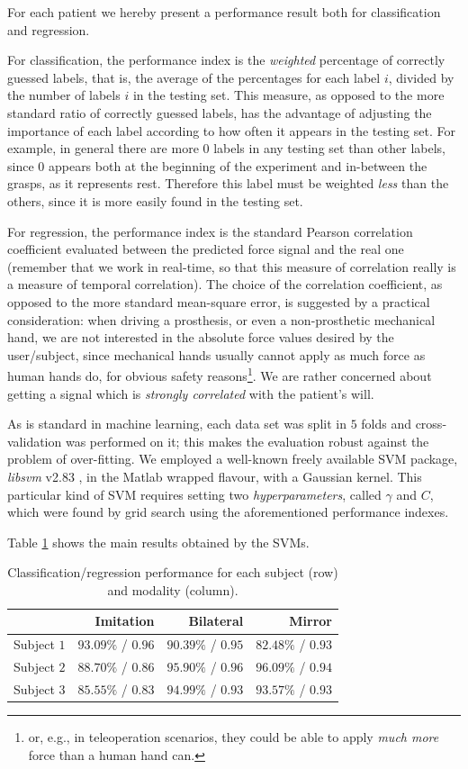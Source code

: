 For each patient we hereby present a performance result both for
classification and regression.

For classification, the performance index is the \emph{weighted}
percentage of correctly guessed labels, that is, the average of the
percentages for each label $i$, divided by the number of labels $i$ in
the testing set. This measure, as opposed to the more standard ratio
of correctly guessed labels, has the advantage of adjusting the
importance of each label according to how often it appears in the
testing set. For example, in general there are more $0$ labels in any
testing set than other labels, since $0$ appears both at the beginning
of the experiment and in-between the grasps, as it represents
rest. Therefore this label must be weighted \emph{less} than the
others, since it is more easily found in the testing set.

For regression, the performance index is the standard Pearson
correlation coefficient evaluated between the predicted force signal
and the real one (remember that we work in real-time, so that this
measure of correlation really is a measure of temporal
correlation). The choice of the correlation coefficient, as opposed to
the more standard mean-square error, is suggested by a practical
consideration: when driving a prosthesis, or even a non-prosthetic
mechanical hand, we are not interested in the absolute force values
desired by the user/subject, since mechanical hands usually cannot
apply as much force as human hands do, for obvious safety
reasons\footnote{or, e.g., in teleoperation scenarios, they could be
able to apply \emph{much more} force than a human hand can.}. We are
rather concerned about getting a signal which is \emph{strongly
correlated} with the patient's will.

As is standard in machine learning, each data set was split in $5$
folds and cross-validation was performed on it; this makes the
evaluation robust against the problem of over-fitting. We employed a
well-known freely available SVM package, \emph{libsvm} v2.83
\cite{ChangL01}, in the Matlab wrapped flavour, with a Gaussian
kernel. This particular kind of SVM requires setting two
\emph{hyperparameters}, called $\gamma$ and $C$, which were found by
grid search using the aforementioned performance indexes.

Table \ref{tab:results} shows the main results obtained by the SVMs.

\begin{table}[!ht] \centering
  \caption{Classification/regression performance for each subject
    (row) and modality (column).}
  \begin{tabular}{|c|r|r|r|}
    \hline
                & Imitation & Bilateral & Mirror \\
    \hline
    Subject $1$ & $93.09\%$ / $0.96$ & $90.39\%$ / $0.95$ & $82.48\%$ / $0.93$ \\
    Subject $2$ & $88.70\%$ / $0.86$ & $95.90\%$ / $0.96$ & $96.09\%$ / $0.94$ \\
    Subject $3$ & $85.55\%$ / $0.83$ & $94.99\%$ / $0.93$ & $93.57\%$ / $0.93$ \\
    \hline
  \end{tabular}
  \label{tab:results}
\end{table}

